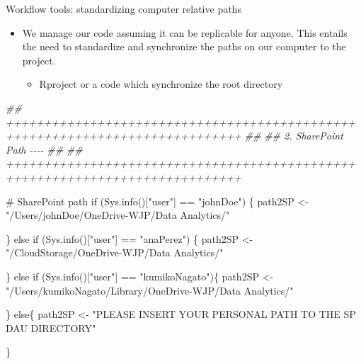 \documentclass[
  ignorenonframetext,
]{beamer}
\newenvironment{Shaded}{\begin{snugshade}}{\end{snugshade}}
\newcommand{\CommentTok}[1]{\textcolor[rgb]{0.37,0.37,0.37}{#1}}
\newcommand{\ControlFlowTok}[1]{\textcolor[rgb]{0.00,0.23,0.31}{#1}}
\newcommand{\DocumentationTok}[1]{\textcolor[rgb]{0.37,0.37,0.37}{\textit{#1}}}
\newcommand{\FunctionTok}[1]{\textcolor[rgb]{0.28,0.35,0.67}{#1}}
\newcommand{\NormalTok}[1]{\textcolor[rgb]{0.00,0.23,0.31}{#1}}
\newcommand{\OtherTok}[1]{\textcolor[rgb]{0.00,0.23,0.31}{#1}}
\newcommand{\SpecialCharTok}[1]{\textcolor[rgb]{0.37,0.37,0.37}{#1}}
\newcommand{\StringTok}[1]{\textcolor[rgb]{0.13,0.47,0.30}{#1}}
\providecommand{\tightlist}{%
  \setlength{\itemsep}{0pt}\setlength{\parskip}{0pt}}\usepackage{longtable,booktabs,array}
\begin{document}
\begin{frame}[fragile]{Workflow tools: standardizing computer relative
paths}
\protect\hypertarget{workflow-tools-standardizing-computer-relative-paths}{}
\begin{itemize}
\item
  We manage our code assuming it can be replicable for anyone. This
  entails the need to standardize and synchronize the paths on our
  computer to the project.

  \begin{itemize}
  \tightlist
  \item
    Rproject or a code which synchronize the root directory
  \end{itemize}
\end{itemize}

\begin{Shaded}
\begin{Highlighting}[]
\DocumentationTok{\#\# +++++++++++++++++++++++++++++++++++++++++++++++++++++++++++++++++++++++++++++}
\DocumentationTok{\#\#}
\DocumentationTok{\#\# 2.  SharePoint Path                                                      {-}{-}{-}{-}}
\DocumentationTok{\#\#}
\DocumentationTok{\#\# +++++++++++++++++++++++++++++++++++++++++++++++++++++++++++++++++++++++++++++}

\CommentTok{\# SharePoint path}
\ControlFlowTok{if}\NormalTok{ (}\FunctionTok{Sys.info}\NormalTok{()[}\StringTok{"user"}\NormalTok{] }\SpecialCharTok{==} \StringTok{"johnDoe"}\NormalTok{) \{}
\NormalTok{  path2SP }\OtherTok{\textless{}{-}} \StringTok{"/Users/johnDoe/OneDrive{-}WJP/Data Analytics/"}

\NormalTok{\} }\ControlFlowTok{else} \ControlFlowTok{if}\NormalTok{ (}\FunctionTok{Sys.info}\NormalTok{()[}\StringTok{"user"}\NormalTok{] }\SpecialCharTok{==} \StringTok{"anaPerez"}\NormalTok{) \{}
\NormalTok{  path2SP }\OtherTok{\textless{}{-}} \StringTok{"/CloudStorage/OneDrive{-}WJP/Data Analytics/"}
  
\NormalTok{\} }\ControlFlowTok{else} \ControlFlowTok{if}\NormalTok{ (}\FunctionTok{Sys.info}\NormalTok{()[}\StringTok{"user"}\NormalTok{] }\SpecialCharTok{==} \StringTok{"kumikoNagato"}\NormalTok{)\{}
\NormalTok{  path2SP }\OtherTok{\textless{}{-}} \StringTok{"/Users/kumikoNagato/Library/OneDrive{-}WJP/Data Analytics/"}
  
\NormalTok{\} }\ControlFlowTok{else}\NormalTok{\{}
\NormalTok{  path2SP }\OtherTok{\textless{}{-}} \StringTok{"PLEASE INSERT YOUR PERSONAL PATH TO THE SP DAU DIRECTORY"}
  
\NormalTok{\}}
\end{Highlighting}
\end{Shaded}
\end{frame}
\end{document}
